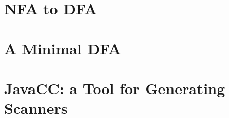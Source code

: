 \documentclass[8pt,a4paper,compress]{beamer}
\begin{document}
\section{NFA to DFA}
\begin{frame}[fragile]
\pause

\end{frame}

\section{A Minimal DFA}
\begin{frame}[fragile]
\pause

\end{frame}

\section{JavaCC: a Tool for Generating Scanners}
\begin{frame}[fragile]
\pause

\end{frame}
\end{document}
